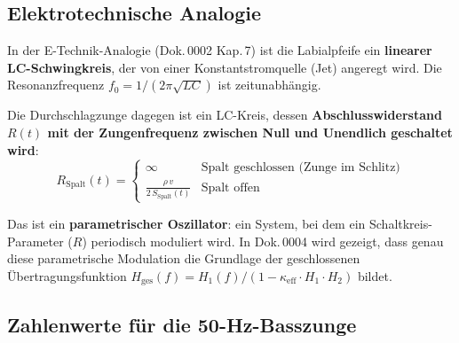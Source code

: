 \documentclass[11pt,a4paper]{article}
\begin{document}
\subsection{Elektrotechnische Analogie}

In der E-Technik-Analogie (Dok.\,0002 Kap.\,7) ist die Labialpfeife ein \textbf{linearer LC-Schwingkreis}, der von einer Konstantstromquelle (Jet) angeregt wird. Die Resonanzfrequenz $f_0 = 1/(2\pi\sqrt{LC})$ ist zeitunabhängig.

Die Durchschlagzunge dagegen ist ein LC-Kreis, dessen \textbf{Abschlusswiderstand $R(t)$ mit der Zungenfrequenz zwischen Null und Unendlich geschaltet wird}:
\begin{equation}
R_\text{Spalt}(t) = \begin{cases}
\infty & \text{Spalt geschlossen (Zunge im Schlitz)} \\
\displaystyle\frac{\rho\, v}{2\, S_\text{Spalt}(t)} & \text{Spalt offen}
\end{cases}
\end{equation}

Das ist ein \textbf{parametrischer Oszillator}: ein System, bei dem ein Schaltkreis-Parameter ($R$) periodisch moduliert wird. In Dok.\,0004 wird gezeigt, dass genau diese parametrische Modulation die Grundlage der geschlossenen Übertragungsfunktion $H_\text{ges}(f) = H_1(f) / (1 - \kappa_\text{eff} \cdot H_1 \cdot H_2)$ bildet.

\subsection{Zahlenwerte für die 50-Hz-Basszunge}

\begin{table}[H]
\centering\small
{}
\caption{Akustische Spaltimpedanz in verschiedenen Phasen des Schwingzyklus (bei 1\,kPa Balgdruck). Faktor zwischen Minimum und Maximum: $\sim$200.}
\end{table}
\end{document}
